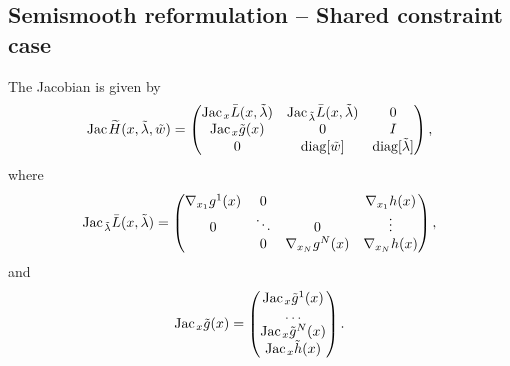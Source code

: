 \documentclass[11pt, a4paper]{article}
\newcommand{\diag}{\textrm{diag}}
\newcommand{\Jac}{\textrm{Jac\hskip+.1em}}
\begin{document}
\subsection{Semismooth reformulation -- Shared constraint case\label{app:ceq:jointcase}}
The Jacobian is given by 
$$
\Jac \widetilde H(x, \tilde \lambda, \tilde w) = 
\left( 
\begin{matrix}
\Jac_x \bar L (x, \tilde \lambda)  & \Jac_{\tilde \lambda} \bar L (x, \tilde \lambda)    & 0 \\
\Jac_x \tilde g(x) & 0 & I \\
0 & \diag[\tilde w] & \diag[\tilde \lambda]
\end{matrix}
\right),
$$
where
$$
\Jac_{\tilde \lambda} \bar L (x, \tilde \lambda) 
=
\left( 
\begin{matrix}
\nabla_{x_1} g^1(x) & 0 &  & \nabla_{x_1} h(x) \\
0 & \ddots & 0 & \vdots \\
 & 0 & \nabla_{x_N} g^N(x) & \nabla_{x_N} h(x) \\
\end{matrix}
\right),
$$
and
$$
\Jac_x \tilde g(x) =
\left( 
\begin{matrix}
\Jac_x \tilde g^1(x) \\ 
\dots \\ 
\Jac_x \tilde g^N(x) \\ 
\Jac_x \tilde h(x) 
\end{matrix}
\right).
$$
\end{document}
